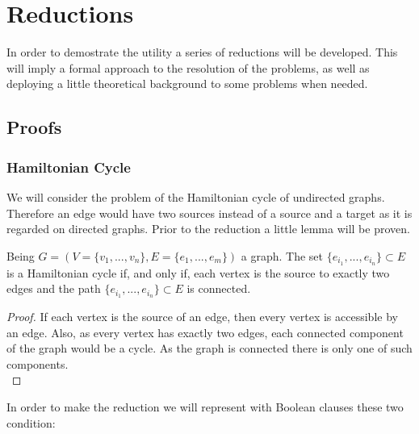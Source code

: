 
\chapter{Reductions} %


In order to demostrate the utility a series of reductions will be developed. This will imply a formal approach to the resolution of the problems, as well as deploying a little theoretical background to some problems when needed.

\section{Proofs}

\subsection{Hamiltonian Cycle}

We will consider the problem of the Hamiltonian cycle of undirected graphs. Therefore an edge would have two sources instead of a source and a target as it is regarded on directed graphs. Prior to the reduction a little lemma will be proven.

\begin{lemma} Being $G=(V=\{ v_1,...,v_n\},E= \{e_1,...,e_m\})$ a graph. The set $ \{e_{i_1},...,e_{i_n}\}\subset E$ is a Hamiltonian cycle if, and only if, each vertex is the source to exactly two edges and the path  $ \{e_{i_1},...,e_{i_n}\}\subset E$ is connected.

  \begin{proof}
	  If each vertex is the source of an edge, then every vertex is accessible by an edge. Also, as every vertex has exactly two edges, each connected component of the graph would be a cycle. As the graph is connected there is only one of such components.\\
  \end{proof}
	
\end{lemma}


In order to make the reduction we will represent with Boolean clauses these two condition:

